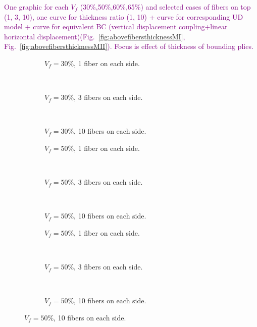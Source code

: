 \documentclass[review]{elsarticle}
\begin{document}
\textcolor{purple}{One graphic for each $V_{f}$ (30\%,50\%,60\%,65\%) and selected cases of fibers on top (1, 3,  10),  one curve for thickness ratio (1, 10) + curve for corresponding UD model + curve for equivalent BC (vertical displacement coupling+linear horizontal displacement)(Fig.~\ref{fig:abovefibersthicknessMI},  Fig.~\ref{fig:abovefibersthicknessMII}). Focus is effect of thickness of bounding plies.}\\

\begin{figure}[!h]
\centering
    \begin{subfigure}[b]{0.3\textwidth}
        \caption{$V_{f}=30\%$, 1 fiber on each side.}\label{subfig:abovefiber30MIcase1}
    \end{subfigure} ~
   \begin{subfigure}[b]{0.3\textwidth}
        \caption{$V_{f}=30\%$, 3 fibers on each side.}\label{subfig:abovefiber30MIcase2}
    \end{subfigure} ~
\begin{subfigure}[b]{0.3\textwidth}
        \caption{$V_{f}=30\%$, 10 fibers on each side.}\label{subfig:abovefiber30MIcase3}
    \end{subfigure}

    \begin{subfigure}[b]{0.3\textwidth}
        \caption{$V_{f}=50\%$, 1 fiber on each side.}\label{subfig:abovefiber50MIcase1}
    \end{subfigure} ~
   \begin{subfigure}[b]{0.3\textwidth}
        \caption{$V_{f}=50\%$, 3 fibers on each side.}\label{subfig:abovefiber50MIcase2}
    \end{subfigure} ~
\begin{subfigure}[b]{0.3\textwidth}
        \caption{$V_{f}=50\%$, 10 fibers on each side.}\label{subfig:abovefiber50MIcase3}
    \end{subfigure}

    \begin{subfigure}[b]{0.3\textwidth}
        \caption{$V_{f}=50\%$, 1 fiber on each side.}\label{subfig:abovefiber60MIcase1}
    \end{subfigure} ~
   \begin{subfigure}[b]{0.3\textwidth}
        \caption{$V_{f}=50\%$, 3 fibers on each side.}\label{subfig:abovefiber60MIcase2}
    \end{subfigure} ~
\begin{subfigure}[b]{0.3\textwidth}
        \caption{$V_{f}=50\%$, 10 fibers on each side.}\label{subfig:abovefiber60MIcase3}
    \end{subfigure}


\end{figure}
\end{document}
